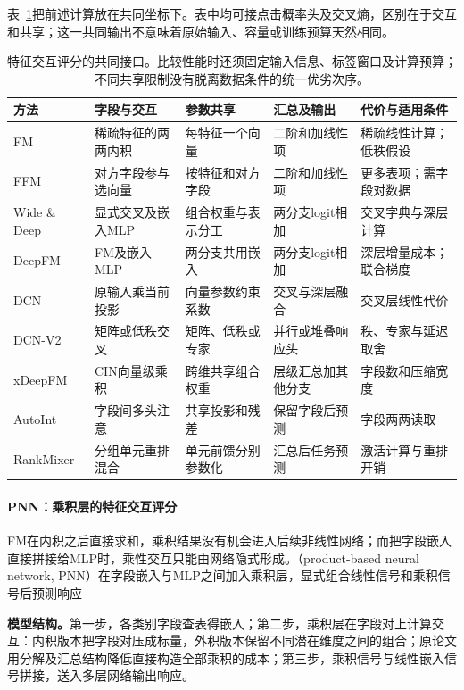表~\ref{tab:rs-feature-models}把前述计算放在共同坐标下。表中均可接点击概率头及交叉熵，区别在于交互和共享；这一共同输出不意味着原始输入、容量或训练预算天然相同。
\begin{table}[htbp]
 \centering\small
 \begin{tabularx}{\linewidth}{@{}lXXXX@{}}
 \toprule
 方法 & 字段与交互 & 参数共享 & 汇总及输出 & 代价与适用条件\\
 \midrule
 FM & 稀疏特征的两两内积 & 每特征一个向量 & 二阶和加线性项 & 稀疏线性计算；低秩假设\\
 FFM & 对方字段参与选向量 & 按特征和对方字段 & 二阶和加线性项 & 更多表项；需字段对数据\\
 Wide \& Deep & 显式交叉及嵌入MLP & 组合权重与表示分工 & 两分支logit相加 & 交叉字典与深层计算\\
 DeepFM & FM及嵌入MLP & 两分支共用嵌入 & 两分支logit相加 & 深层增量成本；联合梯度\\
 DCN & 原输入乘当前投影 & 向量参数约束系数 & 交叉与深层融合 & 交叉层线性代价\\
 DCN-V2 & 矩阵或低秩交叉 & 矩阵、低秩或专家 & 并行或堆叠响应头 & 秩、专家与延迟取舍\\
 xDeepFM & CIN向量级乘积 & 跨维共享组合权重 & 层级汇总加其他分支 & 字段数和压缩宽度\\
 AutoInt & 字段间多头注意 & 共享投影和残差 & 保留字段后预测 & 字段两两读取\\
 RankMixer & 分组单元重排混合 & 单元前馈分别参数化 & 汇总后任务预测 & 激活计算与重排开销\\
 \bottomrule
 \end{tabularx}
 \caption{特征交互评分的共同接口。比较性能时还须固定输入信息、标签窗口及计算预算；不同共享限制没有脱离数据条件的统一优劣次序。}
 \label{tab:rs-feature-models}
\end{table}

\paragraph{PNN：乘积层的特征交互评分}
\label{sec:rs-pnn}

FM在内积之后直接求和，乘积结果没有机会进入后续非线性网络；而把字段嵌入直接拼接给MLP时，乘性交互只能由网络隐式形成。（product-based neural network, PNN）在字段嵌入与MLP之间加入乘积层，显式组合线性信号和乘积信号后预测响应

\textbf{模型结构。}第一步，各类别字段查表得嵌入；第二步，乘积层在字段对上计算交互：内积版本把字段对压成标量，外积版本保留不同潜在维度之间的组合；原论文用分解及汇总结构降低直接构造全部乘积的成本；第三步，乘积信号与线性嵌入信号拼接，送入多层网络输出响应。

